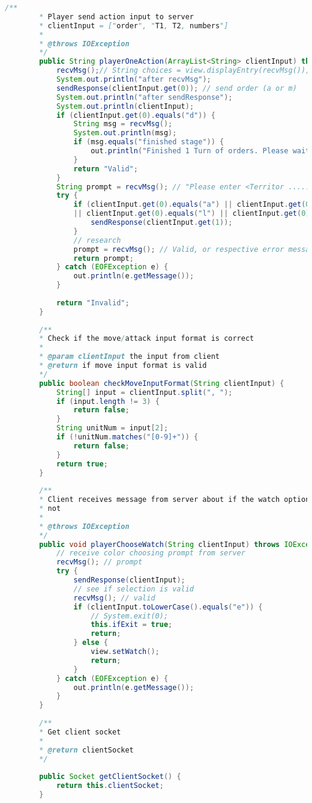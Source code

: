 \documentclass[12pt]{article}
\numberwithin{table}{section}
\begin{document}
\begin{lstlisting}[language=Java]
		/**
		* Player send action input to server
		* clientInput = ["order", "T1, T2, numbers"]
		* 
		* @throws IOException
		*/
		public String playerOneAction(ArrayList<String> clientInput) throws IOException {
			recvMsg();// String choices = view.displayEntry(recvMsg()); old version
			System.out.println("after recvMsg");
			sendResponse(clientInput.get(0)); // send order (a or m)
			System.out.println("after sendResponse");
			System.out.println(clientInput);
			if (clientInput.get(0).equals("d")) {
				String msg = recvMsg();
				System.out.println(msg);
				if (msg.equals("finished stage")) {
					out.println("Finished 1 Turn of orders. Please wait for other players to issue orders.");
				}
				return "Valid";
			}
			String prompt = recvMsg(); // "Please enter <Territor ......"
			try {
				if (clientInput.get(0).equals("a") || clientInput.get(0).equals("m") || clientInput.get(0).equals("u")
				|| clientInput.get(0).equals("l") || clientInput.get(0).equals("s")) {
					sendResponse(clientInput.get(1));
				}
				// research
				prompt = recvMsg(); // Valid, or respective error message, from serverside "tryAction" result
				return prompt;
			} catch (EOFException e) {
				out.println(e.getMessage());
			}
			
			return "Invalid";
		}
		
		/**
		* Check if the move/attack input format is correct
		*
		* @param clientInput the input from client
		* @return if move input format is valid
		*/
		public boolean checkMoveInputFormat(String clientInput) {
			String[] input = clientInput.split(", ");
			if (input.length != 3) {
				return false;
			}
			String unitNum = input[2];
			if (!unitNum.matches("[0-9]+")) {
				return false;
			}
			return true;
		}
		
		/**
		* Client receives message from server about if the watch option is valid or
		* not
		* 
		* @throws IOException
		*/
		public void playerChooseWatch(String clientInput) throws IOException {
			// receive color choosing prompt from server
			recvMsg(); // prompt
			try {
				sendResponse(clientInput);
				// see if selection is valid
				recvMsg(); // valid
				if (clientInput.toLowerCase().equals("e")) {
					// System.exit(0);
					this.ifExit = true;
					return;
				} else {
					view.setWatch();
					return;
				}
			} catch (EOFException e) {
				out.println(e.getMessage());
			}
		}
		
		/**
		* Get client socket
		* 
		* @return clientSocket
		*/
		
		public Socket getClientSocket() {
			return this.clientSocket;
		}
		

\end{lstlisting}
\end{document}
